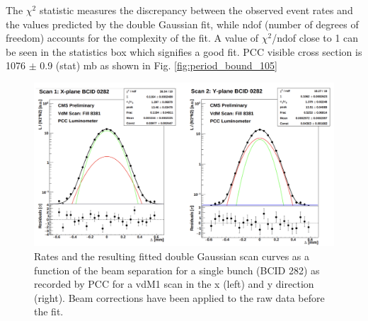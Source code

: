The $\chi^2$ statistic measures the discrepancy between the observed event rates and the values predicted by the double Gaussian fit, while ndof (number of degrees of freedom) accounts for the complexity of the fit. A value of  $\chi^2$/ndof close to 1 can be seen in the statistics box which signifies a good fit. PCC visible cross section is 1076 $\pm$ 0.9 (stat) mb as shown in Fig. \ref{fig:period_bound_105} \cite{pas_22} %


\begin{figure}[!htp]
\centering
\includegraphics[width=1\textwidth]{ashish_thesis/2022_vdM_fit_1.png}
\caption[2022 PCC vdM Fit]{%
  Rates and the resulting fitted double Gaussian scan curves as a function of the beam separation for a single bunch (BCID 282) as recorded by PCC for a vdM1 scan in the x (left) and y direction (right). Beam corrections have been applied to the raw data before the fit.
}
\label{fig:period_bound_50}
\end{figure}

